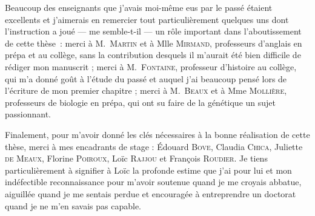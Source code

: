 Beaucoup des enseignants que j'avais moi-même eus par le passé étaient excellents et j'aimerais en remercier tout particulièrement quelques uns dont l'instruction a joué — me semble-t-il — un rôle important dans l'aboutissement de cette thèse~: 
merci à M.\ \textsc{Martin} et à Mlle \textsc{Mirmand}, professeurs d'anglais en prépa et au collège, sans la contribution desquels il m'aurait été bien difficile de rédiger mon manuscrit ; 
merci à M.\ \textsc{Fontaine}, professeur d'histoire au collège, qui m'a donné goût à l'étude du passé et auquel j'ai beaucoup pensé lors de l'écriture de mon premier chapitre ; 
merci à M.\ \textsc{Beaux} et à Mme \textsc{Mollière}, professeurs de biologie en prépa, qui ont su faire de la génétique un sujet passionnant.

Finalement, pour m'avoir donné les clés nécessaires à la bonne réalisation de cette thèse, merci à mes encadrants de stage :
\'Edouard \textsc{Bove},
Claudia \textsc{Chica},
Juliette \textsc{de Meaux},
Florine \textsc{Poiroux},
Loïc \textsc{Rajjou} et
François \textsc{Roudier}.
Je tiens particulièrement à signifier à Loïc la profonde estime que j'ai pour lui et mon indéfectible reconnaissance
pour m'avoir soutenue quand je me croyais abbatue, aiguillée quand je me sentais perdue et 
encouragée à entreprendre un doctorat quand je ne m'en savais pas capable.
\\







